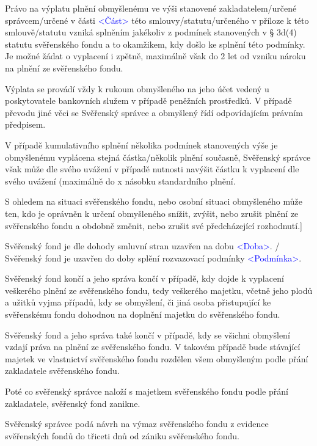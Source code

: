 \documentclass[parskip=half]{scrreprt}
\begin{document}
\begin{contract}
Právo na výplatu plnění obmyšlenému ve výši stanovené zakladatelem/určené správcem/určené v části \textcolor{blue}{<Část>} této smlouvy/statutu/určeného v příloze k této smlouvě/statutu vzniká splněním jakékoliv z podmínek stanovených v § 3d(4) statutu svěřenského fondu a to okamžikem, kdy došlo ke splnění této podmínky. Je možné žádat o vyplacení i zpětně, maximálně však do 2 let od vzniku nároku na plnění ze svěřenského fondu.

Výplata se provádí vždy k rukoum obmyšleného na jeho účet vedený u poskytovatele bankovních služem v případě peněžních prostředků. V případě převodu jiné věci se Svěřenský správce a obmyšlený řídí odpovídajícím právním předpisem.

V případě kumulativního splnění několika podmínek stanovených výše je obmyšlenému vyplácena stejná částka/několik plnění současně, Svěřenský správce však může dle svého uvážení v případě nutnosti navýšit částku k vyplacení dle svého uvážení (maximálně do x násobku standardního plnění.

S ohledem na situaci svěřenského fondu, nebo osobní situaci obmyšleného může ten, kdo je oprávněn k určení obmyšleného snížit, zvýšit, nebo zrušit plnění ze svěřenského fondu a obdobně změnit, nebo zrušit své předcházející rozhodnutí.]
\parnumbertrue


Svěřenský fond je dle dohody smluvní stran uzavřen na dobu \textcolor{blue}{<Doba>}. / Svěřenský fond je uzavřen do doby splění rozvazovací podmínky \textcolor{blue}{<Podmínka>}.

Svěřenský fond končí a jeho správa končí v případě, kdy dojde k vyplacení veškerého plnění ze svěřenského fondu, tedy veškerého majetku, včetně jeho plodů a užitků vyjma případů, kdy se obmyšlení, či jiná osoba přistupující ke svěřenskému fondu dohodnou na doplnění majetku do svěřenského fondu.

Svěřenský fond a jeho správa také končí v případě, kdy se všichni obmyšlení vzdají práva na plnění ze svěřenského fondu. V takovém případě bude stávající majetek ve vlastnictví svěřenského fondu rozdělen všem obmyšleným podle přání zakladatele svěřenského fondu.

Poté co svěřenský správce naloží s majetkem svěřenského fondu podle přání zakladatele, svěřenský fond zanikne.

Svěřenský správce podá návrh na výmaz svěřenského fondu z evidence svěřenských fondů do třiceti dnů od zániku svěřenského fondu.


\end{contract}
\end{document}

